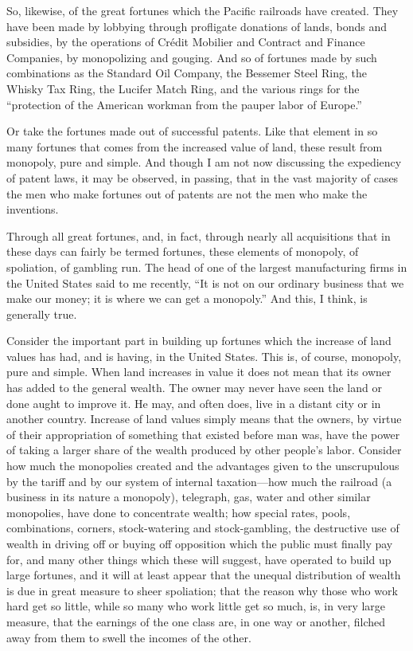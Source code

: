 \documentclass{book}
\begin{document}
So, likewise, of the great fortunes which the Pacific railroads have created. They have been made by lobbying through profligate donations of lands, bonds and subsidies, by the operations of Crédit Mobilier and Contract and Finance Companies, by monopolizing and gouging. And so of fortunes made by such combinations as the Standard Oil Company, the Bessemer Steel Ring, the Whisky Tax Ring, the Lucifer Match Ring, and the various rings for the “protection of the American workman from the pauper labor of Europe.”

Or take the fortunes made out of successful patents. Like that element in so many fortunes that comes from the increased value of land, these result from monopoly, pure and simple. And though I am not now discussing the expediency of patent laws, it may be observed, in passing, that in the vast majority of cases the men who make fortunes out of patents are not the men who make the inventions.

Through all great fortunes, and, in fact, through nearly all acquisitions that in these days can fairly be termed fortunes, these elements of monopoly, of spoliation, of gambling run. The head of one of the largest manufacturing firms in the United States said to me recently, “It is not on our ordinary business that we make our money; it is where we can get a monopoly.” And this, I think, is generally true.

Consider the important part in building up fortunes which the increase of land values has had, and is having, in the United States. This is, of course, monopoly, pure and simple. When land increases in value it does not mean that its owner has added to the general wealth. The owner may never have seen the land or done aught to improve it. He may, and often does, live in a distant city or in another country. Increase of land values simply means that the owners, by virtue of their appropriation of something that existed before man was, have the power of taking a larger share of the wealth produced by other people’s labor. Consider how much the monopolies created and the advantages given to the unscrupulous by the tariff and by our system of internal taxation—how much the railroad (a business in its nature a monopoly), telegraph, gas, water and other similar monopolies, have done to concentrate wealth; how special rates, pools, combinations, corners, stock-watering and stock-gambling, the destructive use of wealth in driving off or buying off opposition which the public must finally pay for, and many other things which these will suggest, have operated to build up large fortunes, and it will at least appear that the unequal distribution of wealth is due in great measure to sheer spoliation; that the reason why those who work hard get so little, while so many who work little get so much, is, in very large measure, that the earnings of the one class are, in one way or another, filched away from them to swell the incomes of the other.
\end{document}
